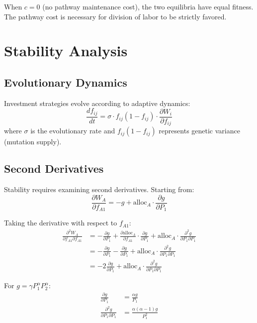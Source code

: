 \documentclass[11pt]{article}
\theoremstyle{definition}
\newcommand{\dd}[2]{\frac{d#1}{d#2}}
\newcommand{\pd}[2]{\frac{\partial #1}{\partial #2}}
\newcommand{\pdd}[3]{\frac{\partial^2 #1}{\partial #2 \partial #3}}
\begin{document}
\begin{corollary}
When $c = 0$ (no pathway maintenance cost), the two equilibria have equal fitness. The pathway cost is necessary for division of labor to be strictly favored.
\end{corollary}

\section{Stability Analysis}

\subsection{Evolutionary Dynamics}

Investment strategies evolve according to adaptive dynamics:
\begin{equation}
\dd{f_{ij}}{t} = \sigma \cdot f_{ij}(1 - f_{ij}) \cdot \pd{W_i}{f_{ij}}
\label{eq:dynamics}
\end{equation}
where $\sigma$ is the evolutionary rate and $f_{ij}(1-f_{ij})$ represents genetic variance (mutation supply).

\subsection{Second Derivatives}

Stability requires examining second derivatives. Starting from:
\begin{equation}
\pd{W_A}{f_{A1}} = -g + \text{alloc}_A \cdot \pd{g}{P_1}
\end{equation}

Taking the derivative with respect to $f_{A1}$:
\begin{align}
\pdd{W_A}{f_{A1}}{f_{A1}} &= -\pd{g}{P_1} + \pd{\text{alloc}_A}{f_{A1}} \cdot \pd{g}{P_1} + \text{alloc}_A \cdot \pdd{g}{P_1}{P_1} \nonumber\\
&= -\pd{g}{P_1} - \pd{g}{P_1} + \text{alloc}_A \cdot \pdd{g}{P_1}{P_1} \nonumber\\
&= -2\pd{g}{P_1} + \text{alloc}_A \cdot \pdd{g}{P_1}{P_1}
\label{eq:d2W}
\end{align}

For $g = \gamma P_1^\alpha P_2^\alpha$:
\begin{align}
\pd{g}{P_1} &= \frac{\alpha g}{P_1} \\
\pdd{g}{P_1}{P_1} &= \frac{\alpha(\alpha - 1)g}{P_1^2}
\end{align}
\end{document}
